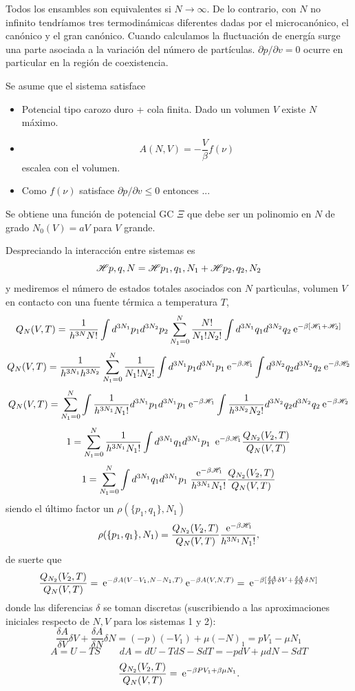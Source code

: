 \documentclass[10pt,oneside]{CBFT_book}
\begin{document}
Todos los ensambles son equivalentes si $N \to \infty$. De lo contrario, con $N$ no infinito
tendríamos tres termodinámicas diferentes dadas por el microcanónico, el canónico y el gran canónico.
Cuando calculamos la fluctuación de energía surge una parte asociada a la variación del número de
partículas. $\partial p / \partial v = 0$ ocurre en particular en la región de coexistencia.

Se asume que el sistema satisface
\begin{itemize}
 \item Potencial tipo carozo duro + cola finita. Dado un volumen $V$ existe $N$ máximo.
 \item \[
	A(N,V) = - \frac{V}{\beta} f(\nu)
 \]
 escalea con el volumen.
 \item Como $f(\nu)$ satisface $ \partial p / \partial v \leq 0$ entonces ...
\end{itemize}

Se obtiene una función de potencial GC $\Xi$ que debe ser un polinomio en $N$ de grado 
$N_0(V) = a V$ para $V$ grande.

Despreciando la interacción entre sistemas es
\[
	\mathscr{H}{p,q,N} = \mathscr{H}{p_1,q_1,N_1} + \mathscr{H}{p_2,q_2,N_2}
\]
y mediremos el número de estados totales asociados con $N$ partìculas, volumen $V$ en contacto
con una fuente térmica a temperatura $T$,
\[
	Q_N (V,T) =  \frac{1}{h^{3N}N!} \int d^{3N_1}p_1 d^{3N_2}p_2  \sum_{N_1=0}^N \frac{N!}{N_1! N_2!}
	\int d^{3N_1}q_1 d^{3N_2}q_2 \:\mathrm{e}^{-\beta [\mathscr{H}_1 + \mathscr{H}_2 ]}
\]
\[
	Q_N (V,T) =  \frac{1}{h^{3N_1} h^{3N_2} } \sum_{N_1=0}^N \frac{1}{N_1! N_2!}
	\int d^{3N_1}p_1 d^{3N_1}p_1 \:\mathrm{e}^{-\beta\mathscr{H}_1} \int d^{3N_2}q_2 d^{3N_2}q_2 \:\mathrm{e}^{-\beta\mathscr{H}_2}
\]
\[
	Q_N (V,T) =  \sum_{N_1=0}^N \int \frac{1}{h^{3N_1}N_1!} d^{3N_1}p_1 d^{3N_1}p_1 \:\mathrm{e}^{-\beta \mathscr{H}_1 }
	\int \frac{1}{h^{3N_2}N_2!} d^{3N_2}q_2 d^{3N_2}q_2 \:\mathrm{e}^{-\beta \mathscr{H}_2 }
\]
\[
	1 = 
	\sum_{N_1=0}^N \frac{1}{h^{3N_1}N_1!} \int d^{3N_1}q_1 d^{3N_1}p_1 \; 
	\:\mathrm{e}^{-\beta\mathscr{H}_1} \frac{Q_{N_2}(V_2,T)}{Q_N(V,T)} 
\]
\[
	1 = 
	\sum_{N_1=0}^N \int d^{3N_1}q_1 d^{3N_1}p_1 \; \frac{\:\mathrm{e}^{-\beta\mathscr{H}_1}}{h^{3N_1}N_1!} 
	\frac{Q_{N_2}(V_2,T)}{Q_N(V,T)} 
\]
siendo el último factor un $ \rho(\{ p_1,q_1\},N_1)$
\[
	\rho(\{ p_1,q_1\},N_1 ) =
	\frac{Q_{N_2}(V_2,T)}{Q_N(V,T)} \frac{\:\mathrm{e}^{-\beta\mathscr{H}_1}}{h^{3N_1}N_1!}, 
\]
de suerte que
\[
	\frac{Q_{N_2}(V_2,T)}{Q_N(V,T)} = \:\mathrm{e}^{-\beta A (V-V_1,N-N_1,T)}\:\mathrm{e}^{-\beta A (V,N,T)} =
	\:\mathrm{e}^{-\beta [ \frac{\delta A}{\delta V} \delta V + \frac{\delta A}{\delta N} \delta N ] }
\]
donde las diferencias $\delta$ se toman discretas (suscribiendo a las aproximaciones iniciales
respecto de $N,V$ para los sistemas 1 y 2):
\[
	\frac{\delta A}{\delta V} \delta V + \frac{\delta A}{\delta N} \delta N =
	(-p )(-V_1) + \mu (-N)_1 = pV_1 - \mu N_1
\]
\[
	A = U - TS \qquad dA = dU - TdS - SdT = -pdV + \mu dN - SdT
\]
\[
	\frac{Q_{N_2}(V_2,T)}{Q_N(V,T)} = \:\mathrm{e}^{-\beta PV_1 + \beta \mu N_1}.
\]
\end{document}

